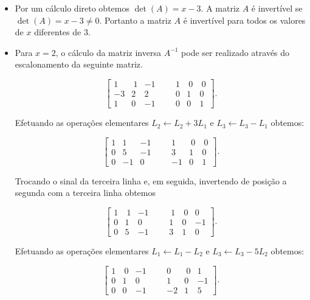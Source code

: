 \begin{solution} 
\begin{itemize}
\item[(a)] Por um cálculo direto obtemos $\det(A)=x-3$. A matriz $A$ é invertível se \linebreak 
$\det(A)=x-3 \neq 0$. Portanto a matriz $A$ é invertível para todos os valores de $x$ diferentes de $3$.

\item[(b)] Para $x=2$, o cálculo da matriz inversa $A^{-1}$ pode ser realizado através do escalonamento da seguinte matriz.

$$\left[ \begin{array}{rrrr|rrrr}
 1 & \ 1 &  -1   & & &     1 &  \ 0 &  \ 0  \\
-3 &   2 &   2   & & &     0 &    1 &    0 \\
 1 &   0 &  -1   & & &     0 &    0 &    1   
\end{array} \right] .$$

Efetuando as operações elementares $L_2 \leftarrow L_2 + 3L_1$ e $L_3 \leftarrow L_3 - L_1$ obtemos:

$$\left[ \begin{array}{rrrr|rrrr}
 1 &   1 &  -1   & & &     1 &  \ 0 &  \ 0  \\
 0 &   5 &  -1   & & &     3 &    1 &    0 \\
 0 &  -1 &   0   & & &    -1 &    0 &    1   
\end{array} \right] .$$

Trocando o sinal da terceira linha e, em seguida, invertendo de posição a segunda com a terceira linha obtemos

$$\left[ \begin{array}{rrrr|rrrr}
 1 & \ 1 &  -1   & & &   \ 1 &  \ 0 &    0  \\
 0 &   1 &   0   & & &     1 &    0 &   -1  \\   
 0 &   5 &  -1   & & &     3 &    1 &    0
\end{array} \right] .$$

Efetuando as operações elementares $L_1 \leftarrow L_1 - L_2$ e $L_3 \leftarrow L_3 - 5L_2$ obtemos:

$$\left[ \begin{array}{rrrr|rrrr}
 1 & \ 0 &  -1   & & &     0 &  \ 0 &    1  \\
 0 &   1 &   0   & & &     1 &    0 &   -1  \\   
 0 &   0 &  -1   & & &    -2 &    1 &    5
\end{array} \right] .$$


\end{itemize}
\end{solution}
